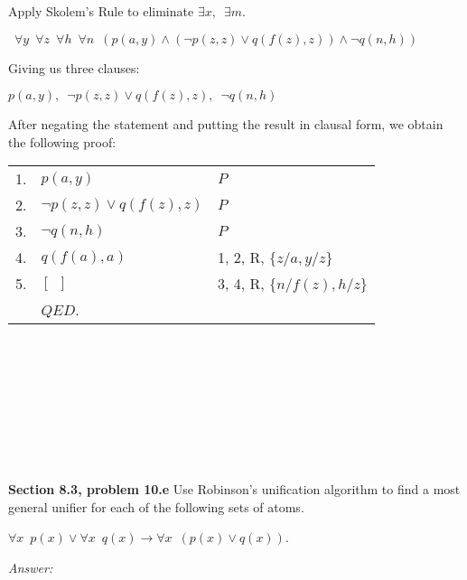 \documentclass[12pt]{article}
\begin{document}
Apply Skolem's Rule to eliminate $\exists x, \enspace \exists m$.

\begin{center}
    $\enspace \forall y \enspace \forall z \enspace \forall h \enspace \forall n 
     \enspace(p(a, y) \land (\neg p(z, z) \lor q(f(z), z)) \land \neg q(n, h))$
\end{center}

Giving us three clauses:

\begin{center}
     $p(a, y), \enspace \neg p(z, z) \lor q(f(z), z), \enspace \neg q(n, h)$
\end{center}

After negating the statement and putting the result in clausal form, we obtain the following proof:

\begin{tabular}{p{.8cm}p{8.5cm}l}
1. & $p(a, y)$ & $P$ \\
2. & $\neg p(z, z) \lor q(f(z), z)$ & $P$ \\
3. & $\neg q(n, h)$ & $P$ \\
4. & $q(f(a), a)$ & 1, 2, R, $\{ z/a, y/z \}$ \\
5. & $[ \enspace ]$ & 3, 4, R, $\{ n/f(z), h/z \}$ \\
& $QED$. \\
\end{tabular}
\\
\\
\\
\\
\\
\\
\\
\\
\textbf{Section 8.3, problem 10.e}   Use Robinson’s unification algorithm to find a most general 
unifier for each of the following sets of atoms.

$\forall x \enspace p(x) \lor \forall x \enspace q(x) \rightarrow \forall x \enspace (p(x) \lor q(x))$.

\emph{Answer:} 
\end{document}
